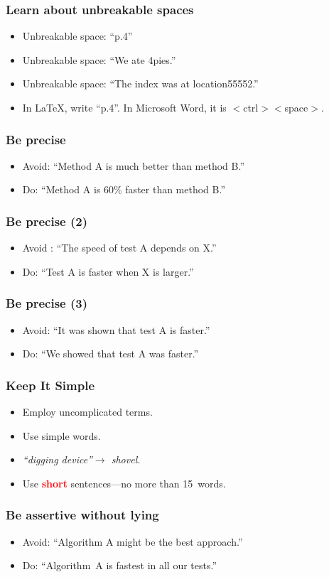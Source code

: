 \documentclass[handout]{beamer}
\newcommand{\vimportant}[1]{\textcolor{red}{\textbf{#1}}}
\begin{document}
\frame
{
  \frametitle{Learn about unbreakable spaces}

 \begin{itemize}
  \item<1->  Unbreakable space: ``p.4''
  \item<2->  Unbreakable space: ``We ate 4pies.''
  \item<2->  Unbreakable space: ``The index was at location55552.''
  \item<3->  In \LaTeX{}, write ``p.\texttildelow{}4''. In Microsoft Word, it is $<$ctrl$><$space$>$.
 \end{itemize}
 }

\frame
{
  \frametitle{Be precise}
  \begin{itemize}
  \item<1->  Avoid: ``Method A is much better than method B.''
  \item<2->  Do: ``Method A is 60\% faster than method B.''
 \end{itemize}
 }

 \frame
{
  \frametitle{Be precise (2)}
  \begin{itemize}
  \item<1-> Avoid : ``The speed of test A depends on X.''
  \item<2->  Do: ``Test A is faster when X is larger.''
 \end{itemize}
 }

 \frame
{
  \frametitle{Be precise (3)}
  \begin{itemize}
 \item<1->           Avoid: ``It was shown that test A is faster.''
  \item<2-> Do: ``We showed that test A was faster.''
 \end{itemize}
 }

\frame
{
  \frametitle{Keep It Simple}
  \begin{itemize}
  \item<1->  Employ uncomplicated terms.
  \item<2->  Use simple words.
  \item<3-> \emph{``digging device''$\to$  shovel.}
    \item<4->  Use \vimportant{short} sentences---no more than 15~words.
 \end{itemize}
 }


\frame
{
  \frametitle{Be assertive without lying}
  \begin{itemize}
  \item<1-> Avoid: ``Algorithm A might be the best approach.''
  \item<2-> Do: ``Algorithm~A is fastest in all our tests.''
 \end{itemize}
 }
\end{document}
